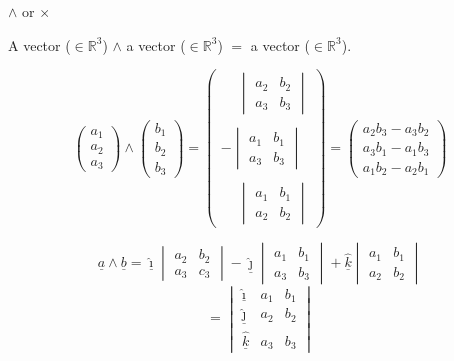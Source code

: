 \documentclass[00_complete]{subfiles}
\begin{document}
\begin{symbols}
$\land$ or $\times$

A vector ($\in \mathbb{R}^3$) $\land$ a vector ($\in \mathbb{R}^3$) $=$ a vector ($\in \mathbb{R}^3$).

$$\begin{pmatrix}
    a_1 \\ a_2 \\a_3
\end{pmatrix} \land \begin{pmatrix}
    b_1 \\ b_2 \\ b_3
\end{pmatrix} = \begin{pmatrix}
    \phantom{-} \begin{vmatrix}
        a_2 & b_2 \\
        a_3 & b_3
    \end{vmatrix} \\
    \\
    - \begin{vmatrix}
        a_1 & b_1 \\
        a_3 & b_3
    \end{vmatrix} \\
    \\
    \phantom{-} \begin{vmatrix}
        a_1 & b_1 \\
        a_2 & b_2
    \end{vmatrix}
\end{pmatrix} = \begin{pmatrix}
    a_2b_3 - a_3b_2 \\
    a_3b_1 - a_1b_3 \\
    a_1b_2 - a_2b_1
\end{pmatrix}$$


$$\underline a \land \underline b = \underline{\hat \imath}
    \begin{vmatrix}
        a_2 & b_2 \\
        a_3 & c_3
    \end{vmatrix}
    - \underline{\hat \jmath} \begin{vmatrix}
        a_1 & b_1 \\
        a_3 & b_3
    \end{vmatrix}
    + \underline{\hat k} \begin{vmatrix}
        a_1 & b_1 \\
        a_2 & b_2
    \end{vmatrix}
$$
$$= \begin{vmatrix}
    \underline{\hat \imath} & a_1 & b_1 \\
    \underline{\hat \jmath} & a_2 & b_2 \\
    \underline{\hat k} & a_3 & b_3
\end{vmatrix}$$

\end{symbols}
\end{document}

